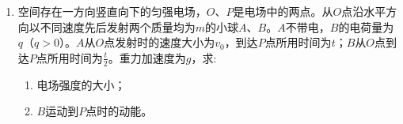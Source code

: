 \begin{enumerate}[leftmargin=0em]
\item
{}
空间存在一方向竖直向下的匀强电场，$ O $、$ P $是电场中的两点。从$ O $点沿水平方向以不同速度先后发射两个质量均为$ m $的小球$ A $、$ B $。$ A $不带电，$ B $的电荷量为$ q $（$ q>0 $）。$ A $从$ O $点发射时的速度大小为$ v_{0} $，到达$ P $点所用时间为$ t $；$ B $从$ O $点到达$ P $点所用时间为$ \frac{t}{2} $。重力加速度为$ g $，求:
\begin{enumerate}
\renewcommand{\labelenumi}{\arabic{enumi}.}
\item
电场强度的大小；
\item 
$ B $运动到$ P $点时的动能。



\end{enumerate}





\end{enumerate}
